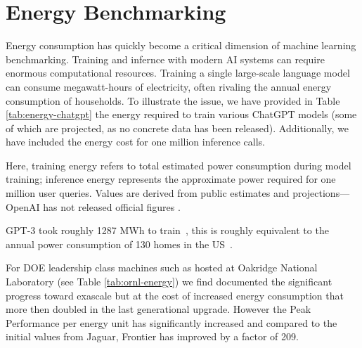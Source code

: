 \section{Energy Benchmarking}
\label{sec:energy}

Energy consumption has quickly become a critical dimension of machine learning benchmarking. Training and infernce with modern AI systems can require enormous computational resources. Training a single large-scale language model can consume megawatt-hours of electricity, often rivaling the annual energy consumption of households.  
To illustrate the issue, we have provided in Table \ref{tab:energy-chatgpt} the energy required to train various ChatGPT models (some of which are projected, as no concrete data has been released). Additionally, we have included the energy cost for one million inference calls.

Here, training energy refers to total estimated power consumption during model training; inference energy represents the approximate power required for one million user queries. Values are derived from public estimates and projections—OpenAI has not released official figures \cite{sciencefeedback2024energy,kaplan2020scaling}.

GPT-3 took roughly 1287 MWh to train~\cite{en18174701}, this is roughly equivalent to the annual power consumption of 130 homes in the US~\cite{WECEnergy}. 

For DOE leadership class machines such as hosted at Oakridge National Laboratory (see Table \ref{tab:ornl-energy}) we find documented the significant progress toward exascale but at the cost of increased energy consumption that more then doubled in the last generational upgrade. However the Peak Performance per energy unit has significantly increased and compared to the initial values from Jaguar, Frontier has improved by a factor of 209.



